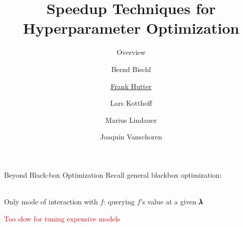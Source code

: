 

\title{Speedup Techniques for Hyperparameter Optimization}
\subtitle{Overview}
\author[Frank Hutter]{Bernd Bischl \and \underline{Frank Hutter} \and Lars Kotthoff\newline \and Marius Lindauer \and Joaquin Vanschoren}
\institute{}
\date{}




\maketitle

\begin{frame}{Beyond Black-box Optimization}
\medskip
Recall general blackbox optimization:\\
        \bigskip
        \begin{center}
        \scalebox{0.7}{\hspace*{1.0cm}
        }\\
        \bigskip
         Only mode of interaction with $f$: querying $f$'s value at a given $\pmb{\lambda}$
        
\pause
        \bigskip
        \bigskip
        \huge{\textcolor{red}{Too slow for tuning expensive models}}
        
        \end{center}
\vspace*{-6cm}
\begin{center}
\scalebox{15}{\color{Red}{$\bm{\times}$}}
\end{center}    
    
\end{frame}




